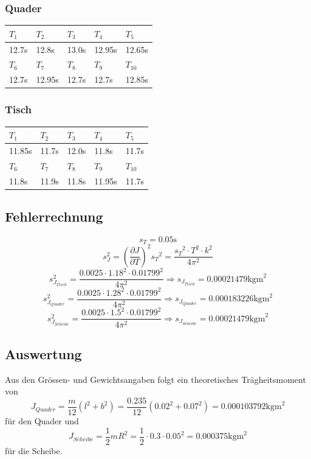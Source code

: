 \documentclass[12pt,a4paper]{article}
\begin{document}
\subsubsection*{Quader}
\begin{tabular}{|l|l|l|l|l|}
\hline
$T_{1}$&$T_{2}$&$T_{3}$&$T_{4}$&$T_{5}$\\
\hline
12.7s&12.8s&13.0s&12.95s&12.65s\\
\hline
\hline
$T_{6}$&$T_{7}$&$T_{8}$&$T_{9}$&$T_{10}$\\
\hline
12.7s&12.95s&12.7s&12.7s&12.85s\\
\hline
\end{tabular}

\subsubsection*{Tisch}
\begin{tabular}{|l|l|l|l|l|}
\hline
$T_{1}$&$T_{2}$&$T_{3}$&$T_{4}$&$T_{5}$\\
\hline
11.85s&11.7s&12.0s&11.8s&11.7s\\
\hline
\hline
$T_{6}$&$T_{7}$&$T_{8}$&$T_{9}$&$T_{10}$\\
\hline
11.8s&11.9s&11.8s&11.95s&11.7s\\
\hline
\end{tabular}

\subsection*{Fehlerrechnung}
\[ s_{T} = 0.05\mbox{s} \]
\[ s_{J}^2 = \left( \frac{\partial J}{\partial T} \right)^2 {s_{T}}^2 = \frac{{s_{T}}^2 \cdot T^2 \cdot k^2}{4 \pi^2} \]
\[ s_{J_{Tisch}}^2 = \frac{0.0025 \cdot 1.18^2 \cdot 0.01799^2}{4 \pi^2} \Rightarrow s_{J_{Tisch}} = 0.00021479 \mbox{kgm}^2 \]
\[ s_{J_{Quader}}^2 = \frac{0.0025 \cdot 1.28^2 \cdot 0.01799^2}{4 \pi^2} \Rightarrow s_{J_{Quader}} = 0.000183226 \mbox{kgm}^2 \]
\[ s_{J_{Scheibe}}^2 = \frac{0.0025 \cdot 1.5^2 \cdot 0.01799^2}{4 \pi^2} \Rightarrow s_{J_{Scheibe}} = 0.00021479 \mbox{kgm}^2 \]

\subsection*{Auswertung}
Aus den Gr\"ossen- und Gewichtsangaben folgt ein theoretisches Tr\"agheitsmoment von
\[ J_{Quader} = \frac{m}{12}(l^2 + b^2) = \frac{0.235}{12}(0.02^2 + 0.07^2) = 0.000103792 \mbox{kgm}^2 \]
f\"ur den Quader und
\[  J_{Scheibe} = \frac{1}{2}mR^2 = \frac{1}{2} \cdot 0.3 \cdot 0.05^2 = 0.000375 \mbox{kgm}^2 \]
f\"ur die Scheibe.
\end{document}
